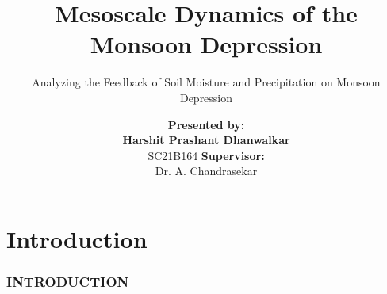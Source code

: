 \documentclass[aspectratio=169,t,xcolor=table]{beamer}
\begin{document}
\title[M.D. Analysis]{Mesoscale Dynamics of the Monsoon Depression}
\subtitle{Analyzing the Feedback of Soil Moisture and Precipitation on Monsoon Depression}

\author[Harshit P. D.]{
	\footnotesize
	\hfill
	\begin{columns}
		\centering
		\textbf{Presented by:} \\
		\textbf{Harshit Prashant Dhanwalkar} \\
		SC21B164
		\centering
		\textbf{Supervisor:} \\
		Dr. A. Chandrasekar
	\end{columns}
	\hfill
}

\date{}
\frame[noframenumbering]{\titlepage}



\section{Introduction}
\begin{frame}{}
	\frametitle{INTRODUCTION}
\end{frame}
\end{document}
